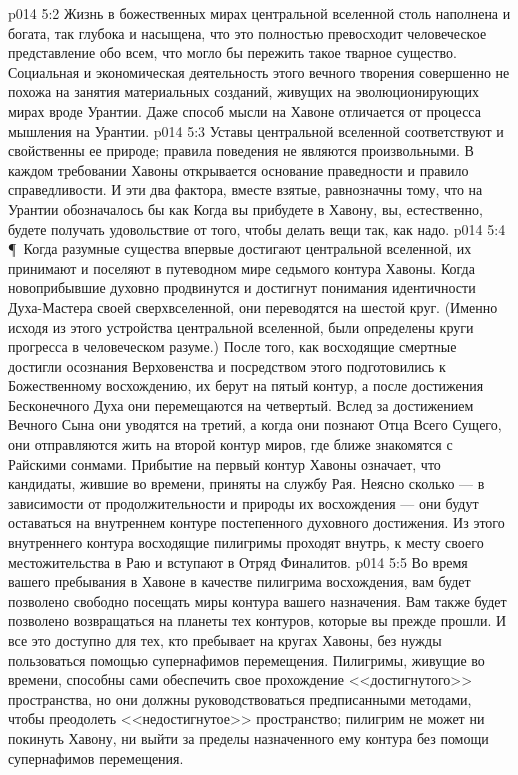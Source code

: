 \vs p014 5:2 Жизнь в божественных мирах центральной вселенной столь наполнена и богата, так глубока и насыщена, что это полностью превосходит человеческое представление обо всем, что могло бы пережить такое тварное существо. Социальная и экономическая деятельность этого вечного творения совершенно не похожа на занятия материальных созданий, живущих на эволюционирующих мирах вроде Урантии. Даже способ мысли на Хавоне отличается от процесса мышления на Урантии.
\vs p014 5:3 Уставы центральной вселенной соответствуют и свойственны ее природе; правила поведения не являются произвольными. В каждом требовании Хавоны открывается основание праведности и правило справедливости. И эти два фактора, вместе взятые, равнозначны тому, что на Урантии обозначалось бы как  Когда вы прибудете в Хавону, вы, естественно, будете получать удовольствие от того, чтобы делать вещи так, как надо.
\vs p014 5:4 \P\ Когда разумные существа впервые достигают центральной вселенной, их принимают и поселяют в путеводном мире седьмого контура Хавоны. Когда новоприбывшие духовно продвинутся и достигнут понимания идентичности Духа\hyp{}Мастера своей сверхвселенной, они переводятся на шестой круг. (Именно исходя из этого устройства центральной вселенной, были определены круги прогресса в человеческом разуме.) После того, как восходящие смертные достигли осознания Верховенства и посредством этого подготовились к Божественному восхождению, их берут на пятый контур, а после достижения Бесконечного Духа они перемещаются на четвертый. Вслед за достижением Вечного Сына они уводятся на третий, а когда они познают Отца Всего Сущего, они отправляются жить на второй контур миров, где ближе знакомятся с Райскими сонмами. Прибытие на первый контур Хавоны означает, что кандидаты, жившие во времени, приняты на службу Рая. Неясно сколько --- в зависимости от продолжительности и природы их восхождения --- они будут оставаться на внутреннем контуре постепенного духовного достижения. Из этого внутреннего контура восходящие пилигримы проходят внутрь, к месту своего местожительства в Раю и вступают в Отряд Финалитов.
\vs p014 5:5 Во время вашего пребывания в Хавоне в качестве пилигрима восхождения, вам будет позволено свободно посещать миры контура вашего назначения. Вам также будет позволено возвращаться на планеты тех контуров, которые вы прежде прошли. И все это доступно для тех, кто пребывает на кругах Хавоны, без нужды пользоваться помощью супернафимов перемещения. Пилигримы, живущие во времени, способны сами обеспечить свое прохождение <<достигнутого>> пространства, но они должны руководствоваться предписанными методами, чтобы преодолеть <<недостигнутое>> пространство; пилигрим не может ни покинуть Хавону, ни выйти за пределы назначенного ему контура без помощи супернафимов перемещения.
